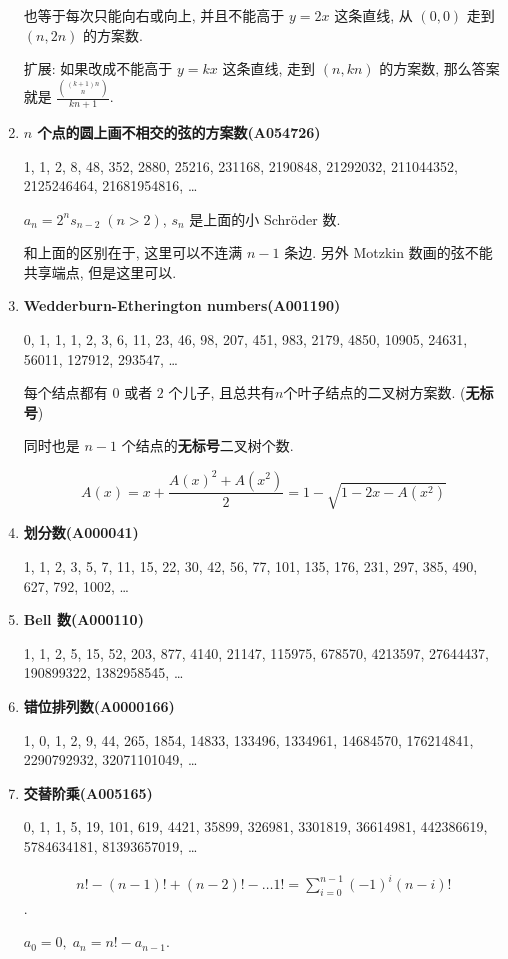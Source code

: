 \begin{enumerate}
          也等于每次只能向右或向上, 并且不能高于 \(y = 2x\) 这条直线, 从 \((0, 0)\) 走到 \((n, 2n)\) 的方案数.

          扩展: 如果改成不能高于 \(y = kx\) 这条直线, 走到 \((n, kn)\) 的方案数, 那么答案就是 \( \frac {{(k + 1)n \choose n}} {kn + 1} \).

    \item \textbf{\(n\) 个点的圆上画不相交的弦的方案数(A054726)}

          1, 1, 2, 8, 48, 352, 2880, 25216, 231168, 2190848, 21292032, 211044352, 2125246464, 21681954816, \dots

          \( a_n = 2^n s_{n - 2} \; (n > 2) \), \(s_n\) 是上面的小 Schr\"oder 数.

          和上面的区别在于, 这里可以不连满 \(n-1\) 条边. 另外 Motzkin 数画的弦不能共享端点, 但是这里可以.

    \item \textbf{Wedderburn-Etherington numbers(A001190)}

          0, 1, 1, 1, 2, 3, 6, 11, 23, 46, 98, 207, 451, 983, 2179, 4850, 10905, 24631, 56011, 127912, 293547, \dots

          每个结点都有 \(0\) 或者 \(2\) 个儿子, 且总共有\(n\)个叶子结点的二叉树方案数. (\textbf{无标号})

          同时也是 \(n-1\) 个结点的\textbf{无标号}二叉树个数.

          \[
              A(x) = x + \frac {A(x) ^ 2 + A(x ^ 2)} 2 = 1 - \sqrt{1 - 2x - A(x ^ 2)}
          \]

    \item \textbf{划分数(A000041)}

          1, 1, 2, 3, 5, 7, 11, 15, 22, 30, 42, 56, 77, 101, 135, 176, 231, 297, 385, 490, 627, 792, 1002, \dots

    \item \textbf{Bell 数(A000110)}

          1, 1, 2, 5, 15, 52, 203, 877, 4140, 21147, 115975, 678570, 4213597, 27644437, 190899322, 1382958545, \dots

    \item \textbf{错位排列数(A0000166)}

          1, 0, 1, 2, 9, 44, 265, 1854, 14833, 133496, 1334961, 14684570, 176214841, 2290792932, 32071101049, \dots

    \item \textbf{交替阶乘(A005165)}

          0, 1, 1, 5, 19, 101, 619, 4421, 35899, 326981, 3301819, 36614981, 442386619, 5784634181, 81393657019, \dots

          \[
              \begin{aligned} n! - (n - 1)! + (n - 2)! - \dots 1! = \sum_{i = 0} ^ {n - 1} (-1)^i (n - i)! \end{aligned}
          \].

          \( a_0 = 0,\; a_n = n! - a_{n - 1} \).
\end{enumerate}

